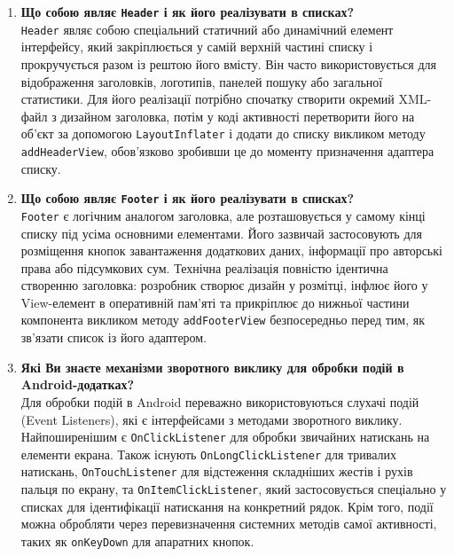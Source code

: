 \documentclass[14pt, a4paper]{extreport}
\begin{document}
\begin{enumerate}
		\item \textbf{Що собою являє \texttt{Header} і як його реалізувати в списках?} \\ \texttt{Header} являє собою спеціальний статичний або динамічний елемент інтерфейсу, який закріплюється у самій верхній частині списку і прокручується разом із рештою його вмісту. Він часто використовується для відображення заголовків, логотипів, панелей пошуку або загальної статистики. Для його реалізації потрібно спочатку створити окремий XML-файл з дизайном заголовка, потім у коді активності перетворити його на об'єкт за допомогою \texttt{LayoutInflater} і додати до списку викликом методу \texttt{addHeaderView}, обов'язково зробивши це до моменту призначення адаптера списку.
		
		\item \textbf{Що собою являє \texttt{Footer} і як його реалізувати в списках?} \\ \texttt{Footer} є логічним аналогом заголовка, але розташовується у самому кінці списку під усіма основними елементами. Його зазвичай застосовують для розміщення кнопок завантаження додаткових даних, інформації про авторські права або підсумкових сум. Технічна реалізація повністю ідентична створенню заголовка: розробник створює дизайн у розмітці, інфлює його у View-елемент в оперативній пам'яті та прикріплює до нижньої частини компонента викликом методу \texttt{addFooterView} безпосередньо перед тим, як зв'язати список із його адаптером.
		
		\item \textbf{Які Ви знаєте механізми зворотного виклику для обробки подій в Android-додатках?} \\ Для обробки подій в Android переважно використовуються слухачі подій (Event Listeners), які є інтерфейсами з методами зворотного виклику. Найпоширенішим є \texttt{OnClickListener} для обробки звичайних натискань на елементи екрана. Також існують \texttt{OnLongClickListener} для тривалих натискань, \texttt{OnTouchListener} для відстеження складніших жестів і рухів пальця по екрану, та \texttt{OnItemClickListener}, який застосовується спеціально у списках для ідентифікації натискання на конкретний рядок. Крім того, події можна обробляти через перевизначення системних методів самої активності, таких як \texttt{onKeyDown} для апаратних кнопок.
		

\end{enumerate}
\end{document}
